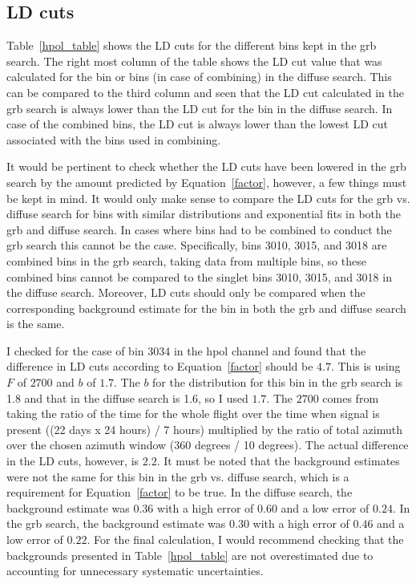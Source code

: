 \subsection{LD cuts}

Table~\ref{hpol_table} shows the LD cuts for the different bins kept in the \gls{grb} search. 
The right most column of the table shows the LD cut value that was calculated for the bin or bins (in case of combining) in the diffuse search. This can be compared to the third column and seen that the LD cut calculated in the \gls{grb} search is always lower than the LD cut for the bin in the diffuse search. In case of the combined bins, the LD cut is always lower than the lowest LD cut associated with the bins used in combining. 

It would be pertinent to check whether the LD cuts have been lowered in the \gls{grb} search by the amount predicted by Equation~\ref{factor}, however, a few things must be kept in mind. It would only make sense to compare the LD cuts for the \gls{grb} vs. diffuse search for bins with similar distributions and exponential fits in both the \gls{grb} and diffuse search. In cases where bins had to be combined to conduct the \gls{grb} search this cannot be the case. Specifically, bins 3010, 3015, and 3018 are combined bins in the \gls{grb} search, taking data from multiple bins, so these combined bins cannot be compared to the singlet bins 3010, 3015, and 3018 in the diffuse search. Moreover, LD cuts should only be compared when the corresponding background estimate for the bin in both the \gls{grb} and diffuse search is the same. 

I checked for the case of bin 3034 in the \gls{hpol} channel and found that the difference in LD cuts according to Equation~\ref{factor} should be $4.7$. This is using $F$ of $2700$ and $b$ of $1.7$. The $b$ for the distribution for this bin in the \gls{grb} search is 1.8 and that in the diffuse search is 1.6, so I used $1.7$. The $2700$ comes from taking the ratio of the time for the whole flight over the time when signal is present ((22 days x 24 hours) / 7 hours) multiplied by the ratio of total azimuth over the chosen azimuth window (360 degrees / 10 degrees). The actual difference in the LD cuts, however, is $2.2$. It must be noted that the background estimates were not the same for this bin in the \gls{grb} vs. diffuse search, which is a requirement for Equation~\ref{factor} to be true.  
In the diffuse search, the background estimate was $0.36$ with a high error of $0.60$ and a low error of $0.24$. 
In the \gls{grb} search, the background estimate was $0.30$ with a high error of $0.46$ and a low error of $0.22$. 
For the final calculation, I would recommend checking that the backgrounds presented in Table~\ref{hpol_table} are not overestimated due to accounting for unnecessary systematic uncertainties. 


